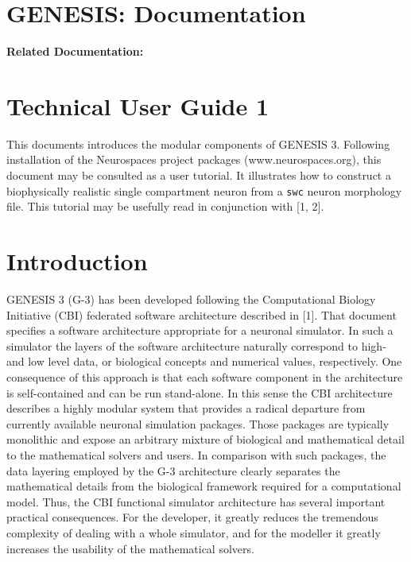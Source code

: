 \documentclass[12pt]{article}
\begin{document}
\section*{GENESIS: Documentation}

{\bf Related Documentation:}

\section*{Technical User Guide 1}

  This documents introduces the modular components of GENESIS 3.
  Following installation of the Neurospaces project packages
  (www.neurospaces.org), this document may be consulted as a user
  tutorial. It illustrates how to construct a biophysically realistic
  single compartment neuron from a {\tt swc} neuron morphology file.
  This tutorial may be usefully read in conjunction with [1, 2].

\section{Introduction}

GENESIS 3 (G-3) has been
developed following the Computational Biology Initiative (CBI)
federated software architecture described in [1]. That document
specifies a software architecture appropriate for a neuronal
simulator. In such a simulator the layers of the software architecture
naturally correspond to high- and low level data, or biological
concepts and numerical values, respectively. One consequence of this
approach is that each software component in the architecture is
self-contained and can be run stand-alone. In this sense the CBI
architecture describes a highly modular system that provides a radical
departure from currently available neuronal simulation packages. Those
packages are typically monolithic and expose an arbitrary mixture of
biological and mathematical detail to the mathematical solvers and
users. In comparison with such packages, the data layering employed by
the G-3 architecture clearly separates the mathematical details from
the biological framework required for a computational model. Thus, the
CBI functional simulator architecture has several important practical
consequences. For the developer, it greatly reduces the tremendous
complexity of dealing with a whole simulator, and for the modeller it
greatly increases the usability of the mathematical solvers.
\end{document}
